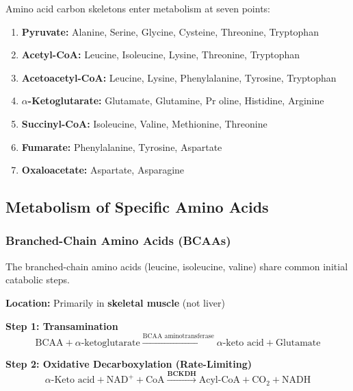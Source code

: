 Amino acid carbon skeletons enter metabolism at seven points:

\begin{enumerate}
    \item \textbf{Pyruvate:} Alanine, Serine, Glycine, Cysteine, Threonine, Tryptophan
    
    \item \textbf{Acetyl-CoA:} Leucine, Isoleucine, Lysine, Threonine, Tryptophan
    
    \item \textbf{Acetoacetyl-CoA:} Leucine, Lysine, Phenylalanine, Tyrosine, Tryptophan
    
    \item \textbf{$\alpha$-Ketoglutarate:} Glutamate, Glutamine, Pr
oline, Histidine, Arginine
    
    \item \textbf{Succinyl-CoA:} Isoleucine, Valine, Methionine, Threonine
    
    \item \textbf{Fumarate:} Phenylalanine, Tyrosine, Aspartate
    
    \item \textbf{Oxaloacetate:} Aspartate, Asparagine
\end{enumerate}

\subsection{Metabolism of Specific Amino Acids}

\subsubsection{Branched-Chain Amino Acids (BCAAs)}

The branched-chain amino acids (leucine, isoleucine, valine) share common initial catabolic steps.

\textbf{Location:} Primarily in \textbf{skeletal muscle} (not liver)

\textbf{Step 1: Transamination}
\[
\text{BCAA} + \alpha\text{-ketoglutarate} \xrightarrow{\text{BCAA aminotransferase}} \alpha\text{-keto acid} + \text{Glutamate}
\]

\textbf{Step 2: Oxidative Decarboxylation (Rate-Limiting)}
\[
\alpha\text{-Keto acid} + \text{NAD}^+ + \text{CoA} \xrightarrow{\textbf{BCKDH}} \text{Acyl-CoA} + \text{CO}_2 + \text{NADH}
\]

